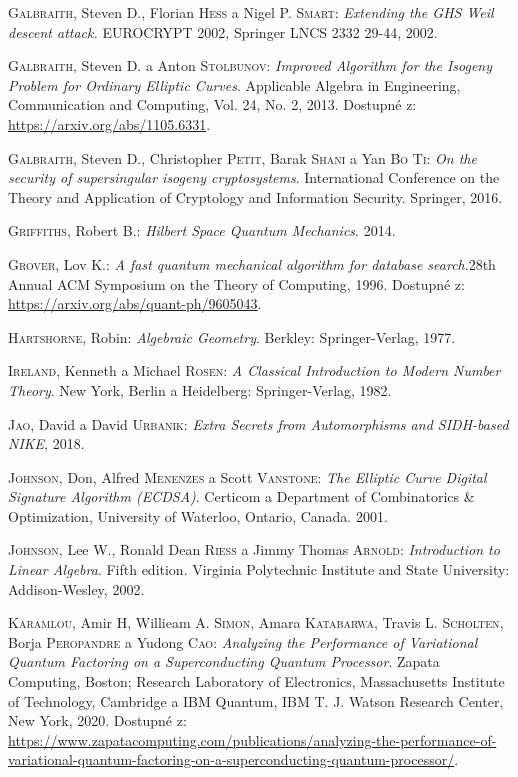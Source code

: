 \documentclass[12pt]{report}
\begin{document}
\begin{thebibliography}{97}
\textsc{Galbraith}, Steven D., Florian \textsc{Hess} a Nigel P. \textsc{Smart}: \textit{Extending the GHS Weil descent attack.} EUROCRYPT 2002,  Springer LNCS 2332 29-44, 2002.

\textsc{Galbraith}, Steven D. a Anton \textsc{Stolbunov}: \textit{Improved Algorithm for the Isogeny Problem for Ordinary Elliptic Curves}. Applicable Algebra in Engineering, Communication and Computing, Vol. 24, No. 2, 2013. Dostupné z: \url{https://arxiv.org/abs/1105.6331}.

\textsc{Galbraith}, Steven D., Christopher \textsc{Petit}, Barak \textsc{Shani} a Yan \textsc{Bo Ti}: \textit{On the security of supersingular isogeny cryptosystems}. International Conference on the Theory and Application of Cryptology and Information Security. Springer, 2016.

\textsc{Griffiths}, Robert B.: \textit{Hilbert Space Quantum Mechanics}. 2014.

\textsc{Grover}, Lov K.: \textit{A fast quantum mechanical algorithm for database search}.28th Annual ACM Symposium on the Theory of Computing, 1996. Dostupné z: \url{https://arxiv.org/abs/quant-ph/9605043}.

\textsc{Hartshorne}, Robin: \textit{Algebraic  Geometry}. Berkley: Springer-Verlag, 1977.

\textsc{Ireland}, Kenneth a Michael \textsc{Rosen}: \textit{A Classical Introduction to Modern Number Theory}. New York, Berlin a Heidelberg: Springer-Verlag, 1982.

\textsc{Jao}, David a David \textsc{Urbanik}: \textit{Extra Secrets from Automorphisms and SIDH-based NIKE}, 2018.

\textsc{Johnson}, Don, Alfred \textsc{Menenzes} a Scott \textsc{Vanstone}: \textit{The Elliptic Curve Digital Signature Algorithm (ECDSA)}. Certicom a Department of Combinatorics \& Optimization, University of Waterloo,  Ontario, Canada. 2001.

\textsc{Johnson}, Lee W., Ronald Dean \textsc{Riess} a Jimmy Thomas \textsc{Arnold}: \textit{Introduction to Linear Algebra}. Fifth edition. Virginia Polytechnic Institute and State University: Addison-Wesley, 2002.

\textsc{Karamlou}, Amir H, Willieam A. \textsc{Simon}, Amara \textsc{Katabarwa}, Travis L. \textsc{Scholten}, Borja \textsc{Peropandre} a Yudong \textsc{Cao}: \textit{Analyzing the Performance of Variational Quantum Factoring on a Superconducting Quantum Processor}. Zapata Computing, Boston; Research Laboratory of Electronics, Massachusetts Institute of Technology, Cambridge a IBM Quantum, IBM T. J. Watson Research Center, New York, 2020. Dostupné z: \url{https://www.zapatacomputing.com/publications/analyzing-the-performance-of-variational-quantum-factoring-on-a-superconducting-quantum-processor/}.


\end{thebibliography}
\end{document}
